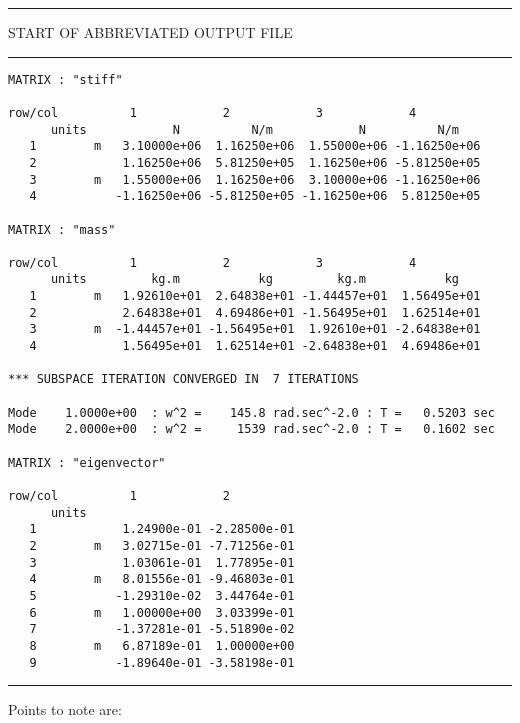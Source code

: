 \vspace{0.20 truein}
\begin{footnotesize}
\noindent
{\rule{1.7 in}{0.035 in} START OF ABBREVIATED OUTPUT FILE \rule{1.7 in}{0.035 in} }
\begin{verbatim}
MATRIX : "stiff"

row/col          1            2            3            4          
      units            N          N/m            N          N/m   
   1        m   3.10000e+06  1.16250e+06  1.55000e+06 -1.16250e+06
   2            1.16250e+06  5.81250e+05  1.16250e+06 -5.81250e+05
   3        m   1.55000e+06  1.16250e+06  3.10000e+06 -1.16250e+06
   4           -1.16250e+06 -5.81250e+05 -1.16250e+06  5.81250e+05

MATRIX : "mass"

row/col          1            2            3            4          
      units         kg.m           kg         kg.m           kg   
   1        m   1.92610e+01  2.64838e+01 -1.44457e+01  1.56495e+01
   2            2.64838e+01  4.69486e+01 -1.56495e+01  1.62514e+01
   3        m  -1.44457e+01 -1.56495e+01  1.92610e+01 -2.64838e+01
   4            1.56495e+01  1.62514e+01 -2.64838e+01  4.69486e+01

*** SUBSPACE ITERATION CONVERGED IN  7 ITERATIONS 

Mode    1.0000e+00  : w^2 =    145.8 rad.sec^-2.0 : T =   0.5203 sec
Mode    2.0000e+00  : w^2 =     1539 rad.sec^-2.0 : T =   0.1602 sec

MATRIX : "eigenvector"

row/col          1            2          
      units                       
   1            1.24900e-01 -2.28500e-01
   2        m   3.02715e-01 -7.71256e-01
   3            1.03061e-01  1.77895e-01
   4        m   8.01556e-01 -9.46803e-01
   5           -1.29310e-02  3.44764e-01
   6        m   1.00000e+00  3.03399e-01
   7           -1.37281e-01 -5.51890e-02
   8        m   6.87189e-01  1.00000e+00
   9           -1.89640e-01 -3.58198e-01
\end{verbatim}
\rule{6.25 in}{0.035 in}
\end{footnotesize}

\vspace{0.15 in}\noindent
Points to note are:

